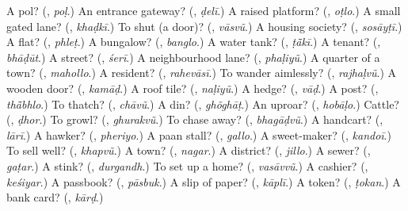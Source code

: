 \begin{tcolorbox}[breakable,colback=teal!4,colframe=teal!35!black,title={Before you move on}]
A pol? (\textbf{}, \emph{poḷ}.) An entrance gateway? (\textbf{}, \emph{ḍelī}.) A raised platform? (\textbf{}, \emph{oṭlo}.) A small gated lane? (\textbf{}, \emph{khaḍkī}.) To shut (a door)? (\textbf{}, \emph{vāsvũ}.) A housing society? (\textbf{}, \emph{sosāyṭī}.) A flat? (\textbf{}, \emph{phleṭ}.) A bungalow? (\textbf{}, \emph{banglo}.) A water tank? (\textbf{}, \emph{ṭā̃kī}.) A tenant? (\textbf{}, \emph{bhāḍūt}.) A street? (\textbf{}, \emph{śerī}.) A neighbourhood lane? (\textbf{}, \emph{phaḷiyũ}.) A quarter of a town? (\textbf{}, \emph{mahollo}.) A resident? (\textbf{}, \emph{rahevāsī}.) To wander aimlessly? (\textbf{}, \emph{rajhaḷvũ}.) A wooden door? (\textbf{}, \emph{kamāḍ}.) A roof tile? (\textbf{}, \emph{naḷiyũ}.) A hedge? (\textbf{}, \emph{vāḍ}.) A post? (\textbf{}, \emph{thā̃bhlo}.) To thatch? (\textbf{}, \emph{chāvũ}.) A din? (\textbf{}, \emph{ghõghāṭ}.) An uproar? (\textbf{}, \emph{hobāḷo}.) Cattle? (\textbf{}, \emph{ḍhor}.) To growl? (\textbf{}, \emph{ghurakvũ}.) To chase away? (\textbf{}, \emph{bhagāḍvũ}.) A handcart? (\textbf{}, \emph{lārī}.) A hawker? (\textbf{}, \emph{pheriyo}.) A paan stall? (\textbf{}, \emph{gallo}.) A sweet-maker? (\textbf{}, \emph{kandoī}.) To sell well? (\textbf{}, \emph{khapvũ}.) A town? (\textbf{}, \emph{nagar}.) A district? (\textbf{}, \emph{jillo}.) A sewer? (\textbf{}, \emph{gaṭar}.) A stink? (\textbf{}, \emph{durgandh}.) To set up a home? (\textbf{}, \emph{vasāvvũ}.) A cashier? (\textbf{}, \emph{keśiyar}.) A passbook? (\textbf{}, \emph{pāsbuk}.) A slip of paper? (\textbf{}, \emph{kāplī}.) A token? (\textbf{}, \emph{ṭokan}.) A bank card? (\textbf{}, \emph{kārḍ}.)
\end{tcolorbox}
